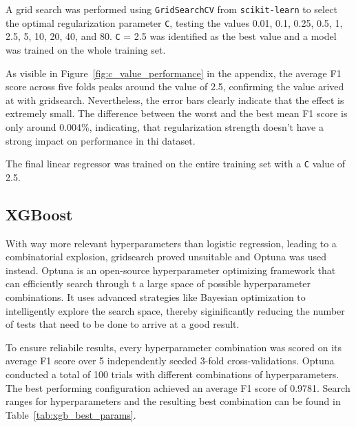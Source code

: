 \documentclass[twocolumn]{article}
\begin{document}
A grid search was performed using \texttt{GridSearchCV} from \texttt{scikit-learn} to select the optimal regularization parameter \texttt{C}, testing the values 0.01, 0.1, 0.25, 0.5, 1, 2.5, 5, 10, 20, 40, and 80. \texttt{C} = 2.5 was identified as the best value and a model was trained on the whole training set.

As visible in Figure~\ref{fig:c_value_performance} in the appendix, the average F1 score across five folds peaks around the value of 2.5, confirming the value arived at with gridsearch. Nevertheless, the error bars clearly indicate that the effect is extremely small. The difference between the worst and the best mean F1 score is only around 0.004\%, indicating, that regularization strength doesn't have a strong impact on performance in thi dataset.

The final linear regressor was trained on the entire training set with a \texttt{C} value of 2.5.

\subsection{XGBoost}

With way more relevant hyperparameters than logistic regression, leading to a combinatorial explosion, gridsearch proved unsuitable and Optuna \parencite{akibaOptunaNextgenerationHyperparameter2019} was used instead. Optuna is an open-source hyperparameter optimizing framework that can efficiently search through t a large space of possible hyperparameter combinations. It uses advanced strategies like Bayesian optimization to intelligently explore the search space, thereby siginificantly reducing the number of tests that need to be done to arrive at a good result.

To ensure reliabile results, every hyperparameter combination was scored on its average F1 score over 5 independently seeded 3-fold cross-validations. Optuna conducted a total of 100 trials with different combinations of hyperparameters. The best performing configuration achieved an average F1 score of 0.9781. Search ranges for hyperparameters and the resulting best combination can be found in Table~\ref{tab:xgb_best_params}.
\end{document}
